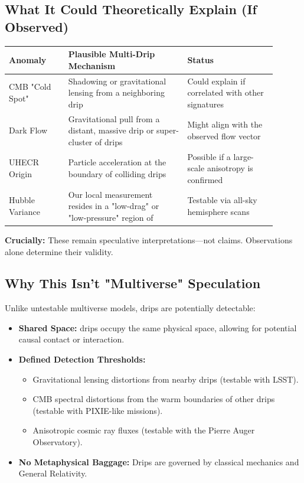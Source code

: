 \documentclass{BSpacePaper} %
\begin{document}
\begin{appendices}
\subsection{What It Could Theoretically Explain (If Observed)}

\begin{center}
    \captionsetup{type=table}
    \label{tab:multi_drip_anomalies}
    \begin{tabular}{@{}>{\raggedright}p{0.2\linewidth} >{\raggedright}p{0.4\linewidth} >{\raggedright\arraybackslash}p{0.3\linewidth}@{}}
    \toprule
    \textbf{Anomaly} & \textbf{Plausible Multi-Drip Mechanism} & \textbf{Status} \\
    \midrule
    CMB "Cold Spot" \citep{Naidoo2016} & Shadowing or gravitational lensing from a neighboring drip & Could explain if correlated with other signatures \\
    \addlinespace
    Dark Flow & Gravitational pull from a distant, massive drip or super-cluster of drips & Might align with the observed flow vector \\
    \addlinespace
    UHECR Origin & Particle acceleration at the boundary of colliding drips & Possible if a large-scale anisotropy is confirmed \\
    \addlinespace
    Hubble Variance & Our local measurement resides in a "low-drag" or "low-pressure" region of \bspace{} & Testable via all-sky hemisphere scans \\
    \bottomrule
    \end{tabular}
\end{center}
\noindent \textbf{Crucially:} These remain speculative interpretations—not claims. Observations alone determine their validity.

\subsection{Why This Isn't "Multiverse" Speculation}
Unlike untestable multiverse models, \bspace{} drips are potentially detectable:
\begin{itemize}
    \item \textbf{Shared Space:} \bspace{} drips occupy the same physical space, allowing for potential causal contact or interaction.
    \item \textbf{Defined Detection Thresholds:}
    \begin{itemize}
        \item Gravitational lensing distortions from nearby drips (testable with LSST).
        \item CMB spectral distortions from the warm boundaries of other drips (testable with PIXIE-like missions).
        \item Anisotropic cosmic ray fluxes (testable with the Pierre Auger Observatory).
    \end{itemize}
    \item \textbf{No Metaphysical Baggage:} Drips are governed by classical mechanics and General Relativity.
\end{itemize}


\end{appendices}
\end{document}
